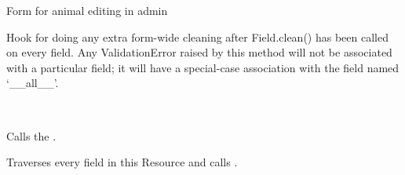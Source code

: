 \documentclass[letterpaper,10pt,openany,oneside,english]{sphinxmanual}
\begin{document}

\begin{fulllineitems}
\label{\detokenize{index:animals.admin.AnimalForm}}
Form for animal editing in admin

\begin{fulllineitems}
\label{\detokenize{index:animals.admin.AnimalForm.clean}}
Hook for doing any extra form-wide cleaning after Field.clean() has been
called on every field. Any ValidationError raised by this method will
not be associated with a particular field; it will have a special-case
association with the field named ‘\_\_all\_\_’.

\end{fulllineitems}


\end{fulllineitems}


\begin{fulllineitems}
\label{\detokenize{index:animals.admin.AnimalResource}}~

\begin{fulllineitems}
\label{\detokenize{index:animals.admin.AnimalResource.get_instance}}
Calls the .

\end{fulllineitems}


\begin{fulllineitems}
\label{\detokenize{index:animals.admin.AnimalResource.import_obj}}
Traverses every field in this Resource and calls
.

\end{fulllineitems}


\end{fulllineitems}
\end{document}
